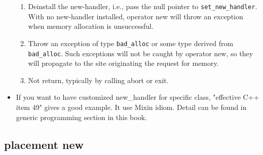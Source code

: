 \documentclass[a4paper,11pt,twoside]{book}
\begin{document}
\begin{itemize}
\begin{enumerate}
		\item Deinstall the new-handler, i.e., pass the null pointer to \texttt{set\_new\_handler}. With no new-handler installed, operator new will throw an exception when memory allocation is unsuccessful.
		
		\item Throw an exception of type \texttt{bad\_alloc} or some type derived from \texttt{bad\_alloc}. Such exceptions will not be caught by operator new, so they will propagate to the site originating the request for memory.
		
		\item Not return, typically by calling abort or exit.
	\end{enumerate}
	\item If you want to have customized new\_handler for specific class, "effective C++ item 49" gives a good example. It use Mixin idiom. Detail can be found in generic programming section in this book.
	
\end{itemize}
\subsection{placement new}
\end{document}
